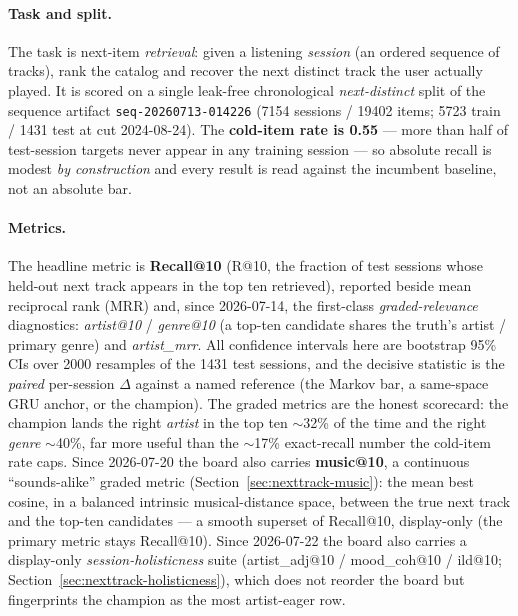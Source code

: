 \documentclass[11pt]{article}
\newcommand{\dsid}[1]{\texttt{\small #1}}
\begin{document}
\paragraph{Task and split.} The task is next-item \emph{retrieval}: given a
listening \emph{session} (an ordered sequence of tracks), rank the catalog and
recover the next distinct track the user actually played. It is scored on a
single leak-free chronological \emph{next-distinct} split of the sequence
artifact \dsid{seq-20260713-014226} (\num{7154} sessions / \num{19402} items;
\num{5723} train / \num{1431} test at cut 2024-08-24). The \textbf{cold-item
rate is 0.55} --- more than half of test-session targets never appear in any
training session --- so absolute recall is modest \emph{by construction} and
every result is read against the incumbent baseline, not an absolute bar.

\paragraph{Metrics.} The headline metric is \textbf{Recall@10} (R@10, the
fraction of test sessions whose held-out next track appears in the top ten
retrieved), reported beside mean reciprocal rank (MRR) and, since 2026-07-14,
the first-class \emph{graded-relevance} diagnostics: \emph{artist@10} /
\emph{genre@10} (a top-ten candidate shares the truth's artist / primary genre)
and \emph{artist\_mrr}. All confidence intervals here are bootstrap 95\% CIs
over \num{2000} resamples of the \num{1431} test sessions, and the decisive
statistic is the \emph{paired} per-session $\Delta$ against a named reference
(the Markov bar, a same-space GRU anchor, or the champion). The graded metrics
are the honest scorecard: the champion lands the right \emph{artist} in the
top ten $\sim$32\% of the time and the right \emph{genre} $\sim$40\%, far more
useful than the $\sim$17\% exact-recall number the cold-item rate caps. Since
2026-07-20 the board also carries \textbf{music@10}, a continuous
``sounds-alike'' graded metric (Section~\ref{sec:nexttrack-music}): the mean best
cosine, in a balanced intrinsic musical-distance space, between the true next
track and the top-ten candidates --- a smooth superset of Recall@10, display-only
(the primary metric stays Recall@10). Since 2026-07-22 the board also carries a
display-only \emph{session-holisticness} suite (artist\_adj@10 / mood\_coh@10 /
ild@10; Section~\ref{sec:nexttrack-holisticness}), which does not reorder the board
but fingerprints the champion as the most artist-eager row.
\end{document}
